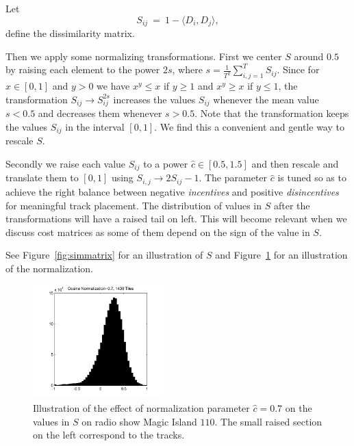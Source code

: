 \documentclass[twocolumn]{article}
\begin{document}
	Let
	\[
	S_{ij} ~=~ 1-\langle D_{i}, D_{j}\rangle,
	\] define the dissimilarity matrix.
	
Then we apply some normalizing transformations. First we center $S$
around $0.5$ by raising each element to the power $2s$, where
$s=\frac{1}{T^2}\sum_{i,j=1}^TS_{ij}$. Since for $x\in [0,1]$ and
$y>0$ we have $x^y\le x$ if $y\ge 1$ and $x^y\ge x$ if $y\le 1$, the
transformation $S_{ij}\to S_{ij}^{2s}$ increases the values $S_{ij}$
whenever the mean value $s<0.5$ and decreases them whenever
$s>0.5$. Note that the transformation keeps the values $S_{ij}$ in the
interval $[0,1]$. We find this a convenient and gentle way to rescale
$S$.

Secondly we raise each value $S_{ij}$ to a power $\hat c \in
[0.5,1.5]$ and then rescale and translate them to $[0,1]$ using
$S_{i,j}\to 2S_{ij}-1$.  The parameter $\hat c$ is tuned so as to
achieve the right balance between negative \textit{incentives} and
positive \textit{disincentives} for meaningful track placement. The
distribution of values in $S$ after the transformations will have a
raised tail on left. This will become relevant when we discuss cost
matrices as some of them depend on the sign of the value in $S$.
	
	See Figure~\ref{fig:simmatrix} for an illustration of $S$ and Figure~\ref{fig:cosine_norm} for an illustration of the  normalization.
	
		\begin{figure}
			\centering
			\includegraphics[width=0.45\textwidth]{images/cosinesmagic110}
			
			\caption{Illustration of the effect of normalization parameter $\hat c=0.7$ on the values in $S$ on radio show Magic Island $110$. The small raised section on the left correspond to the tracks.}
			\label{fig:cosine_norm}
		\end{figure} 
	
\end{document}
